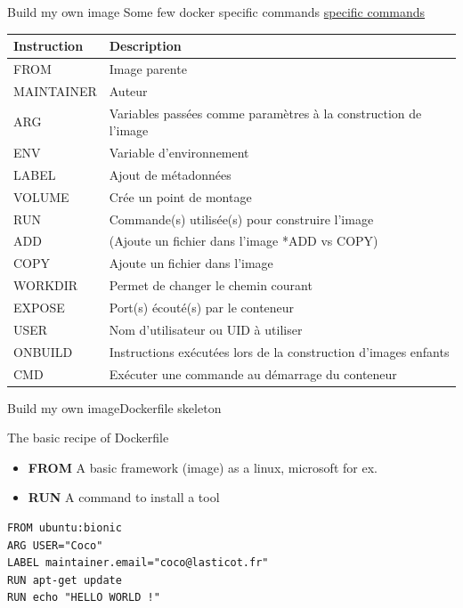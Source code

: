 \begin{frame}{Build my own image}
Some few docker specific commands \href{https://docs.docker.com/engine/reference/commandline/cli/}{specific commands}
\newline
\newline
\centering
\begin{tabular}{ll}
Instruction & Description \\
\hline\hline
FROM & Image parente \\
MAINTAINER & Auteur \\
ARG & Variables passées comme paramètres à la construction de l'image \\
ENV & Variable d'environnement \\
LABEL & Ajout de métadonnées \\
VOLUME & Crée un point de montage \\
RUN & Commande(s) utilisée(s) pour construire l'image \\
ADD & (Ajoute un fichier dans l'image *ADD vs COPY) \\
COPY & Ajoute un fichier dans l'image \\
WORKDIR & Permet de changer le chemin courant \\
EXPOSE & Port(s) écouté(s) par le conteneur \\
USER & Nom d'utilisateur ou UID à utiliser \\
ONBUILD & Instructions exécutées lors de la construction d'images enfants \\
CMD & Exécuter une commande au démarrage du conteneur \\
\end{tabular}
\end{frame}

\begin{frame}[fragile]{Build my own image}{Dockerfile skeleton}
\begin{block}{The basic recipe of Dockerfile}
\begin{itemize}
\item \textbf{FROM} A basic framework (image) as a linux, microsoft for ex. 
\item \textbf{RUN} A command to install a tool
\end{itemize}
\end{block}
\begin{verbatim}
FROM ubuntu:bionic
ARG USER="Coco"
LABEL maintainer.email="coco@lasticot.fr"
RUN apt-get update
RUN echo "HELLO WORLD !"
\end{verbatim}
\end{frame}


